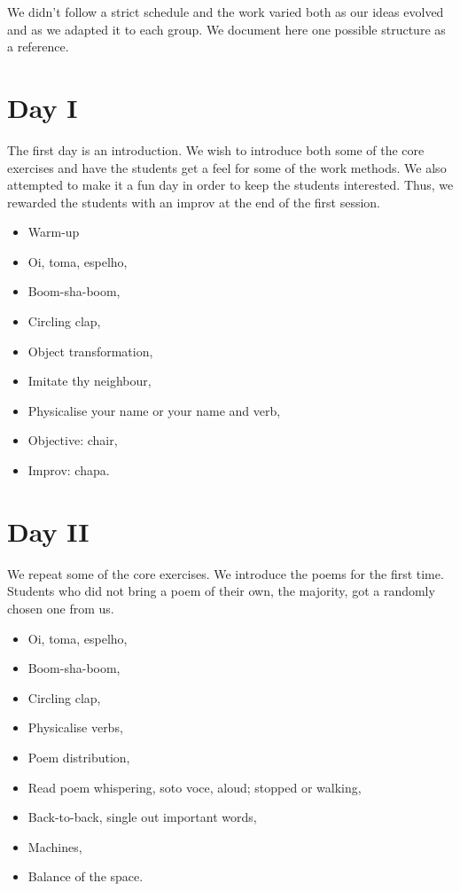 \documentclass[article,twocolumn,twoside]{memoir}
\begin{document}
We didn't follow a strict schedule and the work varied both as our ideas
evolved and as we adapted it to each group. We document here one possible
structure as a reference.

\section{Day I}
The first day is an introduction. We wish to introduce both some of the core
exercises and have the students get a feel for some of the work methods. We
also attempted to make it a fun day in order to keep the students interested.
Thus, we rewarded the students with an improv at the end of the first session.

\begin{itemize}
\item Warm-up
\item Oi, toma, espelho,
\item Boom-sha-boom,
\item Circling clap,
\item Object transformation,
\item Imitate thy neighbour,
\item Physicalise your name or your name and verb,
\item Objective: chair,
\item Improv: chapa.
\end{itemize}
\section{Day II}

We repeat some of the core exercises. We introduce the poems for the first
time. Students who did not bring a poem of their own, the majority, got a
randomly chosen one from us.

\begin{itemize}
\item Oi, toma, espelho,
\item Boom-sha-boom,
\item Circling clap,
\item Physicalise verbs,
\item Poem distribution,
\item Read poem whispering, soto voce, aloud; stopped or walking,
\item Back-to-back, single out important words,
\item Machines,
\item Balance of the space.
\end{itemize}
\end{document}

